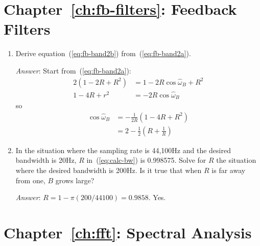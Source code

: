 \section{Chapter~\ref{ch:fb-filters}: Feedback Filters}
\label{sc:ch4ex}

\begin{enumerate}

\item Derive equation~(\ref{eq:fb-band2b})
  from~(\ref{eq:fb-band2a}).\label{it:ch4ex1}

  \textit{Answer}: Start
  from~(\ref{eq:fb-band2a}):
  \begin{align*}
    2(1-2R+R^2) &= 1-2R\cos\hat{\omega}_B + R^2 \\
    1-4R+r^2    &= -2R\cos\hat{\omega}_B
  \end{align*}
  so 
  \begin{align*}
    \cos\hat{\omega}_B &= -\frac{1}{2R}(1-4R+R^2) \\
    &= 2-\frac{1}{2}(R+\frac{1}{R})
  \end{align*}

\item In the situation where the sampling rate is 44,100Hz and the
  desired bandwidth is 20Hz, $R$ in~(\ref{eq:calc-bw}) is 0.998575.
  Solve for $R$ the situation where the desired bandwidth is 200Hz. Is
  it true that when $R$ is far away from one, $B$ grows
  large?\label{it:ch4ex2}

  \textit{Answer}: $R=1-\pi(200/44100)=0.9858$. Yes.

\end{enumerate}



\section{Chapter~\ref{ch:fft}: Spectral Analysis}
\label{sc:ch7ex}

